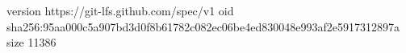 version https://git-lfs.github.com/spec/v1
oid sha256:95aa000c5a907bd3d0f8b61782c082ec06be4ed830048e993af2e5917312897a
size 11386
